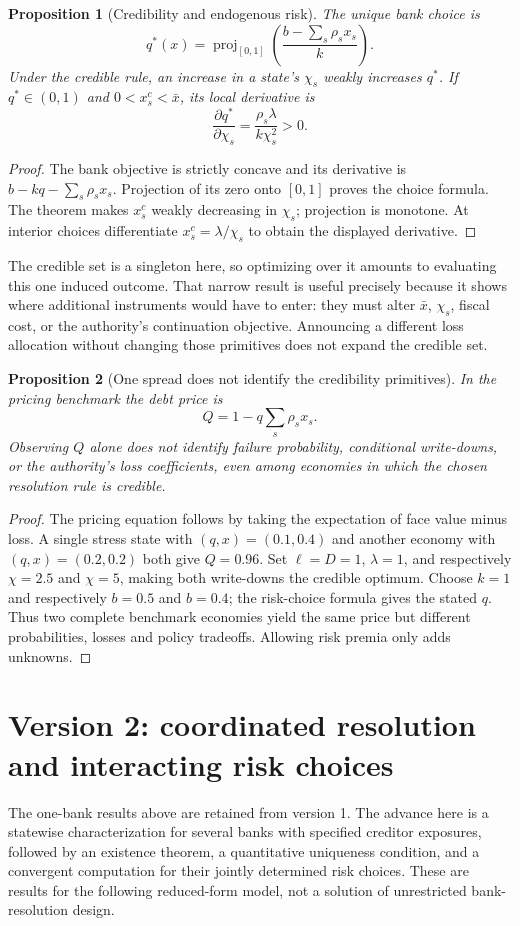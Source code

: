 \documentclass[11pt]{article}
\newtheorem{proposition}{Proposition}
\theoremstyle{definition}
\begin{document}
\begin{proposition}[Credibility and endogenous risk]
The unique bank choice is
\[
 q^*(x)=\operatorname{proj}_{[0,1]}
 \left(\frac{b-\sum_s\rho_sx_s}{k}\right).
\]
Under the credible rule, an increase in a state's $\chi_s$ weakly increases $q^*$. If $q^*\in(0,1)$ and $0<x_s^c<\bar x$, its local derivative is
\[
 \frac{\partial q^*}{\partial\chi_s}
       =\frac{\rho_s\lambda}{k\chi_s^2}>0.
\]
\end{proposition}
\begin{proof}
The bank objective is strictly concave and its derivative is $b-kq-\sum_s\rho_sx_s$. Projection of its zero onto $[0,1]$ proves the choice formula. The theorem makes $x_s^c$ weakly decreasing in $\chi_s$; projection is monotone. At interior choices differentiate $x_s^c=\lambda/\chi_s$ to obtain the displayed derivative.
\end{proof}
The credible set is a singleton here, so optimizing over it amounts to evaluating this one induced outcome. That narrow result is useful precisely because it shows where additional instruments would have to enter: they must alter $\bar x$, $\chi_s$, fiscal cost, or the authority's continuation objective. Announcing a different loss allocation without changing those primitives does not expand the credible set.

\begin{proposition}[One spread does not identify the credibility primitives]
In the pricing benchmark the debt price is
\[
 Q=1-q\sum_s\rho_sx_s.
\]
Observing $Q$ alone does not identify failure probability, conditional write-downs, or the authority's loss coefficients, even among economies in which the chosen resolution rule is credible.
\end{proposition}
\begin{proof}
The pricing equation follows by taking the expectation of face value minus loss. A single stress state with $(q,x)=(0.1,0.4)$ and another economy with $(q,x)=(0.2,0.2)$ both give $Q=0.96$. Set $\ell=D=1$, $\lambda=1$, and respectively $\chi=2.5$ and $\chi=5$, making both write-downs the credible optimum. Choose $k=1$ and respectively $b=0.5$ and $b=0.4$; the risk-choice formula gives the stated $q$. Thus two complete benchmark economies yield the same price but different probabilities, losses and policy tradeoffs. Allowing risk premia only adds unknowns.
\end{proof}


\section*{Version 2: coordinated resolution and interacting risk choices}
The one-bank results above are retained from version 1. The advance here is a
statewise characterization for several banks with specified creditor exposures,
followed by an existence theorem, a quantitative uniqueness condition, and a
convergent computation for their jointly determined risk choices. These are
results for the following reduced-form model, not a solution of unrestricted
bank-resolution design.
\end{document}
